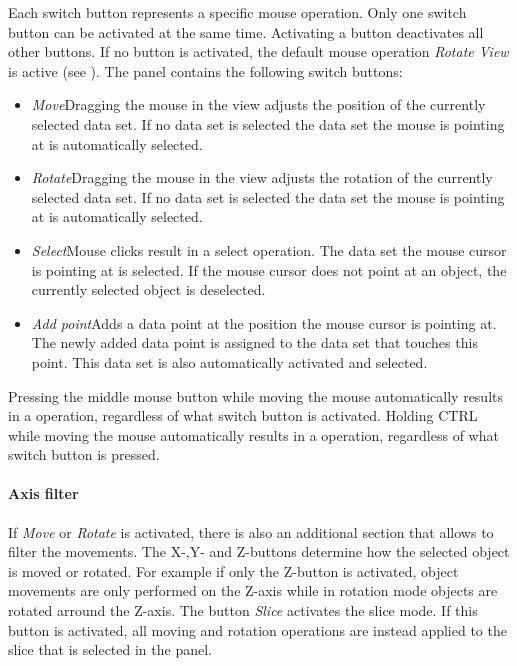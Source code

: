 Each switch button represents a specific mouse operation. Only one switch button can be activated at the same time. Activating a button
deactivates all other buttons. If no button is activated, the default mouse operation \emph{Rotate View} is active
(see ).
The panel contains the following switch buttons:

\begin{itemize}
  \item{\emph{Move}\newline Dragging the mouse in the view adjusts the position of the currently selected data set.
  If no data set is selected the data set the mouse is pointing at is automatically selected.}
  \item{\emph{Rotate}\newline Dragging the mouse in the view adjusts the rotation of the currently selected data set.
  If no data set is selected the data set the mouse is pointing at is automatically selected.}
  \item{\emph{Select}\newline Mouse clicks result in a select operation. The data set the mouse cursor is pointing at is selected.
  If the mouse cursor does not point at an object, the currently selected object is deselected.}
  \item{\emph{Add point}\newline Adds a data point at the position the mouse cursor is pointing at.
  The newly added data point is assigned to the data set that touches this point.
  This data set is also automatically activated and selected.}
\end{itemize}

Pressing the middle mouse button while moving the mouse automatically results in a  operation, regardless of what switch button is activated.\newline
Holding CTRL while moving the mouse automatically results in a  operation, regardless of what switch button is pressed.

\paragraph{Axis filter}
If \emph{Move} or \emph{Rotate} is activated, there is also an additional section that allows to filter the movements.
The X-,Y- and Z-buttons determine how the selected object is moved or rotated. For example if only the Z-button is activated,
object movements are only performed on the Z-axis while in rotation mode objects are rotated arround the Z-axis. The button \emph{Slice} activates
the slice mode. If this button is activated, all moving and rotation operations are instead applied to the slice that is selected in the
 panel.

